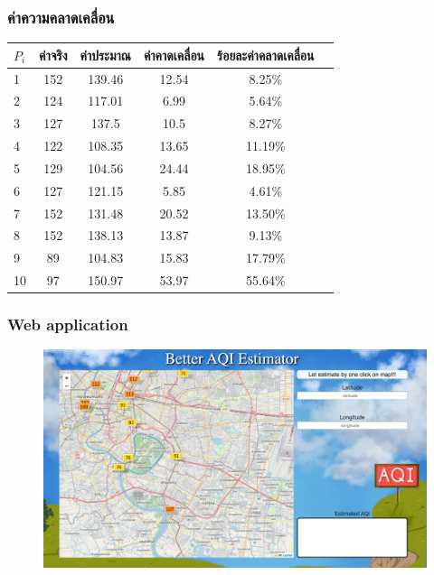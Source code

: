 \documentclass[12pt,aspectratio=169]{beamer}
\begin{document}
\begin{frame}
    \frametitle{ค่าความคลาดเคลื่อน}
        \begin{center}
        \begin{tabular}{lccccc} 
        \hline
        $P_i$ & ค่าจริง &ค่าประมาณ &  ค่าคาดเคลื่อน & ร้อยละค่าคลาดเคลื่อน\\
        \hline
        1 & 152 & 139.46   &12.54 &8.25\% \\
        2 &124 & 117.01   &6.99  &5.64\% \\
        3  &127   & 137.5   &10.5  &8.27\% \\
        4  &122  & 108.35   &13.65 &11.19\% \\
        5 &129 & 104.56   &24.44 &18.95\% \\
        6  &127  & 121.15   &5.85  &4.61\% \\
        7&152 & 131.48   &20.52 &13.50\% \\
        8  &152 & 138.13   &13.87 &9.13\% \\
        9 &89 & 104.83   &15.83 &17.79\% \\
        10 &97 & 150.97   &53.97 &55.64\% \\
        \hline
        \end{tabular}
    \end{center}
\end{frame}

\begin{frame}
    \frametitle{Web application}
        \begin{center}
            \begin{figure}
                \centering
                \includegraphics[width=\textwidth]{img/web-app.jpeg}
            \end{figure}
        \end{center}
    \end{frame}
\end{document}
